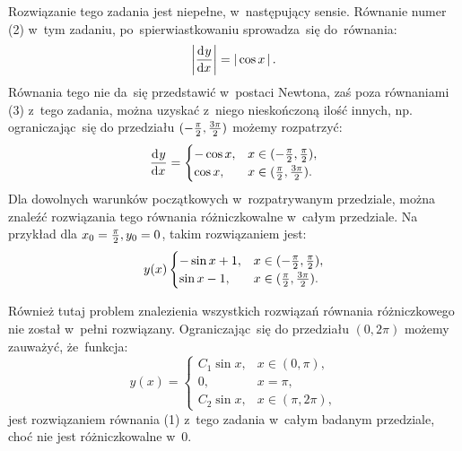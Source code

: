 \documentclass[a4paper,11pt]{article}
\begin{document}
\vspace{\spaceTwo}








\start {}  Rozwiązanie tego zadania jest
niepełne, w~następujący sensie. Równanie numer (2) w~tym zadaniu,
po~spierwiastkowaniu sprowadza~się do~równania:
\begin{equation*}\label{eq:II-1}
  \left| \frac{ \mathrm{d}^{  } {  y  } }{ \mathrm{d} {  x  }^{  } } \right| = \left| \,  \cos x  \, \right|.
\end{equation*}
Równania tego nie da~się przedstawić w~postaci Newtona, zaś poza
równaniami (3) z~tego zadania, można uzyskać z~niego nieskończoną
ilość innych, np. ograniczając~się do przedziału
$( -\frac{ \pi }{ 2 }, \frac{ 3 \pi }{ 2 })$ możemy rozpatrzyć:
\begin{equation*}
  \frac{ \mathrm{d}^{  } {  y  } }{ \mathrm{d} {  x  }^{  } } =
  \begin{cases}
    -\cos x,& x \in ( -\frac{ \pi }{ 2 }, \frac{ \pi }{ 2 } ), \\
    \cos x,& x \in ( \frac{ \pi }{ 2 }, \frac{ 3 \pi }{ 2 } ).
  \end{cases}
\end{equation*}
Dla dowolnych warunków początkowych w~rozpatrywanym przedziale, można
znaleźć rozwiązania tego równania różniczkowalne w~całym przedziale.
Na przykład dla $x_{ 0 } = \frac{ \pi }{ 2 }, y_{ 0 } = 0$, takim
rozwiązaniem jest:
\begin{equation*}
  y( x )
  \begin{cases}
    -\sin x + 1,& x \in ( -\frac{ \pi }{ 2 }, \frac{ \pi }{ 2 } ), \\
    \sin x - 1,& x \in ( \frac{ \pi }{ 2 }, \frac{ 3 \pi }{ 2 } ).
  \end{cases}
\end{equation*}

\vspace{\spaceFour}


\start {}  Również tutaj problem znalezienia
wszystkich rozwiązań równania różniczkowego nie został w~pełni
rozwiązany. Ograniczając~się do przedziału $( 0, 2 \pi )$ możemy
zauważyć, że~funkcja:
\begin{equation*}
  y( x ) =
  \begin{cases}
    C_{ 1 } \sin x,& x \in ( 0, \pi ), \\
    0, & x = \pi, \\
    C_{ 2 } \sin x,& x \in ( \pi, 2 \pi ),
  \end{cases}
\end{equation*}
jest rozwiązaniem równania (1) z~tego zadania w~całym badanym
przedziale, choć nie jest różniczkowalne w~0.
\end{document}
